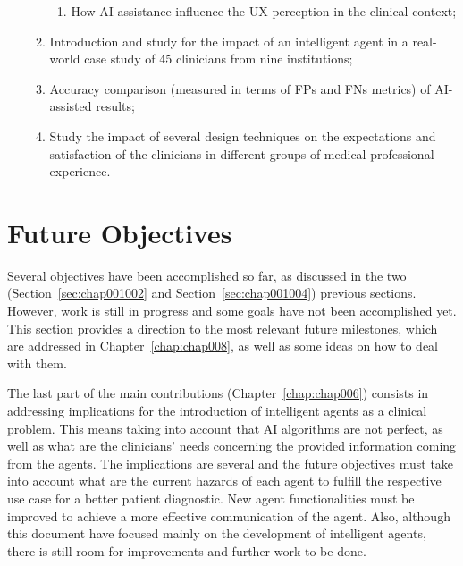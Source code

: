 \begin{enumerate}
\begin{enumerate}[label*=\arabic*.]
\begin{enumerate}[label*=\arabic*.]
\item How \ac{AI}-assistance influence the \ac{UX} perception in the clinical context;
\end{enumerate}
\item Introduction and study for the impact of an intelligent agent in a real-world case study of 45 clinicians from nine institutions;
\item Accuracy comparison (measured in terms of \acp{FP} and \acp{FN} metrics) of \ac{AI}-assisted results;
\item Study the impact of several design techniques on the expectations and satisfaction of the clinicians in different groups of medical professional experience.
\end{enumerate}
\end{enumerate}

\clearpage

\section{Future Objectives}
\label{sec:chap001005}

Several objectives have been accomplished so far, as discussed in the two (Section~\ref{sec:chap001002} and Section~\ref{sec:chap001004}) previous sections.
However, work is still in progress and some goals have not been accomplished yet.
This section provides a direction to the most relevant future milestones, which are addressed in Chapter~\ref{chap:chap008}, as well as some ideas on how to deal with them.

The last part of the main contributions (Chapter~\ref{chap:chap006}) consists in addressing implications for the introduction of intelligent agents as a clinical problem.
This means taking into account that \ac{AI} algorithms are not perfect, as well as what are the clinicians' needs concerning the provided information coming from the agents.
The implications are several and the future objectives must take into account what are the current hazards of each agent to fulfill the respective use case for a better patient diagnostic.
New agent functionalities must be improved to achieve a more effective communication of the agent.
Also, although this document have focused mainly on the development of intelligent agents, there is still room for improvements and further work to be done.

